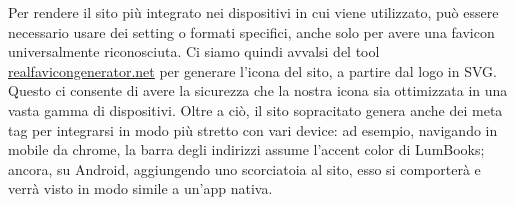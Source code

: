 Per rendere il sito più integrato nei dispositivi in cui viene utilizzato, può essere necessario usare dei setting o formati specifici, anche solo per avere una favicon universalmente riconosciuta. Ci siamo quindi avvalsi del tool \url{realfavicongenerator.net} per generare l'icona del sito, a partire dal logo in SVG. Questo ci consente di avere la sicurezza che la nostra icona sia ottimizzata in una vasta gamma di dispositivi. Oltre a ciò, il sito sopracitato genera anche dei meta tag per integrarsi in modo più stretto con vari device: ad esempio, navigando in mobile da chrome, la barra degli indirizzi assume l'accent color di LumBooks; ancora, su Android, aggiungendo uno scorciatoia al sito, esso si comporterà e verrà visto in modo simile a un'app nativa.